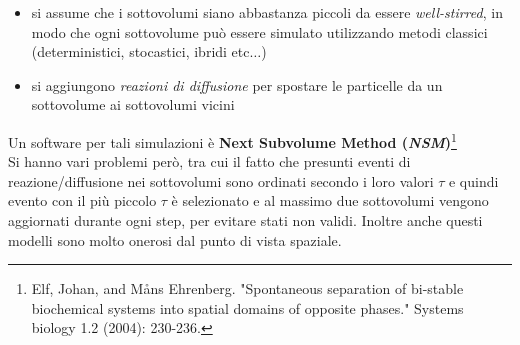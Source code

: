 \documentclass[a4paper,12pt, oneside]{book}
\begin{document}
\begin{enumerate}
\begin{itemize}
    \item si assume che i sottovolumi siano abbastanza piccoli da essere
    \textit{well-stirred}, in modo che ogni sottovolume può essere simulato
    utilizzando metodi classici (deterministici, stocastici, ibridi etc$\ldots$)
    \item si aggiungono \textit{reazioni di diffusione} per spostare le
    particelle da un 
    sottovolume ai sottovolumi vicini 
  \end{itemize}
  Un software per tali simulazioni è \textbf{Next Subvolume Method
    (\textit{NSM})}\footnote{Elf, Johan, and Måns Ehrenberg. "Spontaneous
    separation of bi-stable biochemical systems into spatial domains of opposite
    phases." Systems biology 1.2 (2004): 230-236.}  \\
  Si hanno vari problemi però, tra cui il fatto che presunti eventi di
  reazione/diffusione nei sottovolumi sono ordinati secondo i loro valori $\tau$
  e quindi evento con il più piccolo $\tau$ è selezionato e al massimo due
  sottovolumi vengono aggiornati durante ogni step, per evitare stati non
  validi. Inoltre anche questi modelli sono molto onerosi dal punto di vista
  spaziale. 
\end{enumerate}
\end{document}
